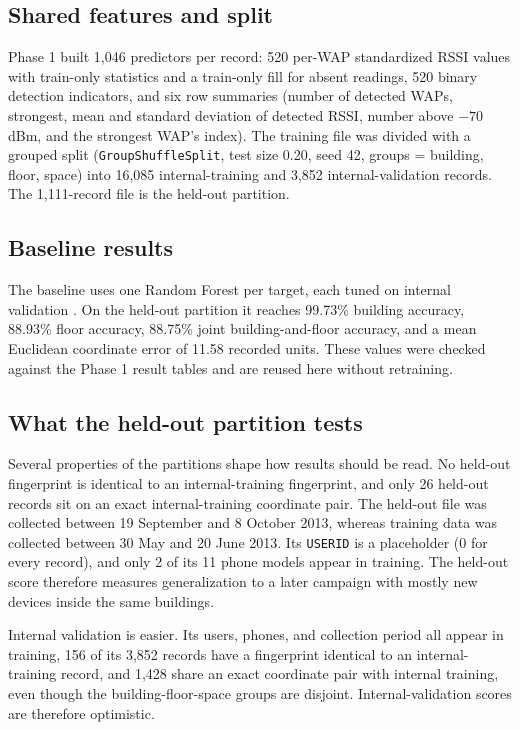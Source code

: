 \documentclass[conference]{IEEEtran}
\begin{document}
\subsection{Shared features and split}
Phase 1 built 1,046 predictors per record: 520 per-WAP standardized RSSI values with train-only statistics and a train-only fill for absent readings, 520 binary detection indicators, and six row summaries (number of detected WAPs, strongest, mean and standard deviation of detected RSSI, number above $-70$ dBm, and the strongest WAP's index). The training file was divided with a grouped split (\texttt{GroupShuffleSplit}, test size 0.20, seed 42, groups = building, floor, space) into 16,085 internal-training and 3,852 internal-validation records. The 1,111-record file is the held-out partition.

\subsection{Baseline results}
The baseline uses one Random Forest per target, each tuned on internal validation \cite{breiman2001}. On the held-out partition it reaches 99.73\% building accuracy, 88.93\% floor accuracy, 88.75\% joint building-and-floor accuracy, and a mean Euclidean coordinate error of 11.58 recorded units. These values were checked against the Phase 1 result tables and are reused here without retraining.

\subsection{What the held-out partition tests}
Several properties of the partitions shape how results should be read. No held-out fingerprint is identical to an internal-training fingerprint, and only 26 held-out records sit on an exact internal-training coordinate pair. The held-out file was collected between 19 September and 8 October 2013, whereas training data was collected between 30 May and 20 June 2013. Its \texttt{USERID} is a placeholder (0 for every record), and only 2 of its 11 phone models appear in training. The held-out score therefore measures generalization to a later campaign with mostly new devices inside the same buildings.

Internal validation is easier. Its users, phones, and collection period all appear in training, 156 of its 3,852 records have a fingerprint identical to an internal-training record, and 1,428 share an exact coordinate pair with internal training, even though the building-floor-space groups are disjoint. Internal-validation scores are therefore optimistic.
\end{document}
